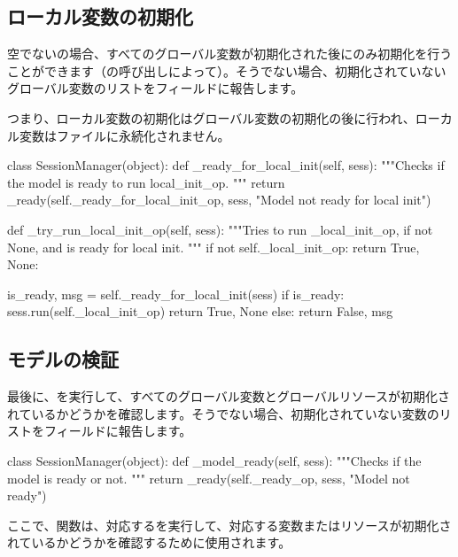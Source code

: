 \begin{content}
\subsection{ローカル変数の初期化}

空でないの場合、すべてのグローバル変数が初期化された後にのみ初期化を行うことができます（の呼び出しによって）。そうでない場合、初期化されていないグローバル変数のリストをフィールドに報告します。

つまり、ローカル変数の初期化はグローバル変数の初期化の後に行われ、ローカル変数はファイルに永続化されません。

\begin{leftbar}
\begin{python}
class SessionManager(object):
  def _ready_for_local_init(self, sess):
    """Checks if the model is ready to run local_init_op.
    """
    return _ready(self._ready_for_local_init_op, sess,
                  "Model not ready for local init")

  def _try_run_local_init_op(self, sess):
    """Tries to run _local_init_op, if not None, 
       and is ready for local init.
    """
    if not self._local_init_op:
      return True, None:
    
    is_ready, msg = self._ready_for_local_init(sess)
    if is_ready:
      sess.run(self._local_init_op)
      return True, None
    else:
      return False, msg
\end{python}
\end{leftbar}

\subsection{モデルの検証}

最後に、を実行して、すべてのグローバル変数とグローバルリソースが初期化されているかどうかを確認します。そうでない場合、初期化されていない変数のリストをフィールドに報告します。

\begin{leftbar}
\begin{python}
class SessionManager(object):
  def _model_ready(self, sess):
    """Checks if the model is ready or not.
    """
    return _ready(self._ready_op, sess, "Model not ready")
\end{python}
\end{leftbar}

ここで、関数は、対応するを実行して、対応する変数またはリソースが初期化されているかどうかを確認するために使用されます。


\end{content}
